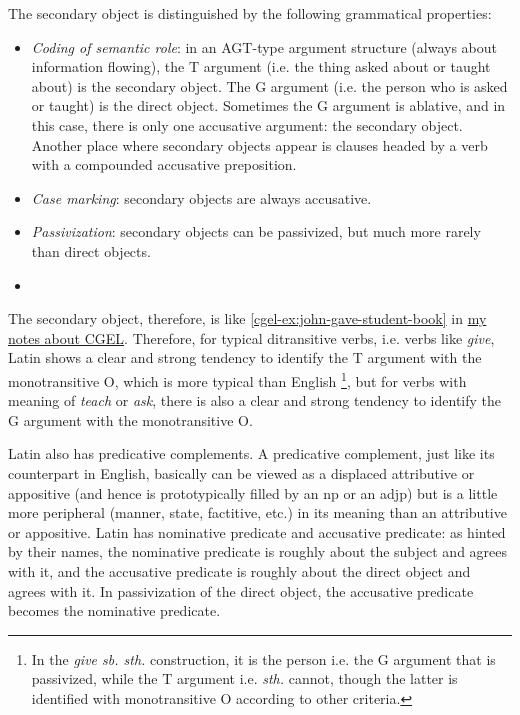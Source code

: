 \documentclass{article}
\newcommand*{\corpus}[1]{\emph{#1}}
\newcommand{\cgel}{\href{../English/cambridge.pdf}{my notes about CGEL}}
\begin{document}
The secondary object is distinguished by the following grammatical properties:
\begin{itemize}
    \item \emph{Coding of semantic role}: in an AGT-type argument structure (always about information flowing),
    the T argument (i.e. the thing asked about or taught about) is the secondary object.
    The G argument (i.e. the person who is asked or taught) is the direct object.
    Sometimes the G argument is ablative, and in this case, 
    there is only one accusative argument: the secondary object.
    Another place where secondary objects appear is 
    clauses headed by a verb with a compounded accusative preposition. %
    \item \emph{Case marking}: secondary objects are always accusative.
    \item \emph{Passivization}: secondary objects can be passivized, but much more rarely than direct objects.
    \item %
\end{itemize}
The secondary object, therefore, is like \eqref{cgel-ex:john-gave-student-book} in \cgel.
Therefore, for typical ditransitive verbs, i.e. verbs like \corpus{give}, 
Latin shows a clear and strong tendency to identify the T argument with the monotransitive O,
which is more typical than English%
\footnote{
    In the \corpus{give sb. sth.} construction, it is the person i.e. the G argument that is passivized,
    while the T argument i.e. \corpus{sth.} cannot, though the latter is identified with monotransitive O
    according to other criteria. 
},
but for verbs with meaning of \corpus{teach} or \corpus{ask},
there is also a clear and strong tendency to identify the G argument with the monotransitive O.

Latin also has predicative complements.
A predicative complement, just like its counterpart in English,
basically can be viewed as a displaced attributive or appositive 
(and hence is prototypically filled by an \ac{np} or an \acs{adjp})
but is a little more peripheral (manner, state, factitive, etc.) 
in its meaning than an attributive or appositive.
Latin has nominative predicate and accusative predicate:
as hinted by their names, 
the nominative predicate is roughly about the subject and agrees with it,
and the accusative predicate is roughly about the direct object and agrees with it.
In passivization of the direct object,
the accusative predicate becomes the nominative predicate.
\end{document}

